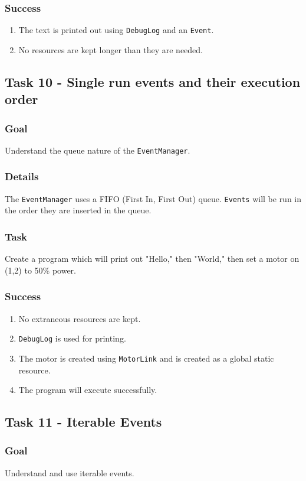 \documentclass[a4paper]{article}
\begin{document}
\subsubsection{Success} \begin{enumerate}\item{The text is printed out using \lstinline{DebugLog} and an \lstinline{Event}.}\item{No resources are kept longer than they are needed.}\end{enumerate}

\subsection{Task 10 - Single run events and their execution order}
\subsubsection{Goal} Understand the queue nature of the \lstinline{EventManager}.
\subsubsection{Details} The \lstinline{EventManager} uses a FIFO (First In, First Out) queue. \lstinline{Events} will be run in the order they are inserted in the queue.
\subsubsection{Task} Create a program which will print out "Hello," then "World," then set a motor on (1,2) to 50\% power.
\subsubsection{Success} \begin{enumerate}\item{No extraneous resources are kept.}\item{\lstinline{DebugLog} is used for printing.}\item{The motor is created using \lstinline{MotorLink} and is created as a global static resource.}\item{The program will execute successfully.}\end{enumerate}

\subsection{Task 11 - Iterable Events}
\subsubsection{Goal} Understand and use iterable events.
\end{document}
